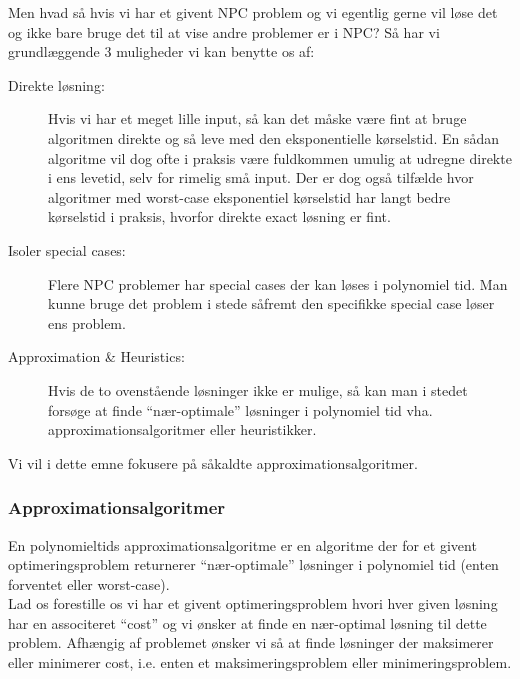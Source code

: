 Men hvad så hvis vi har et givent NPC problem og vi egentlig gerne vil løse det og ikke bare bruge det til at vise andre problemer er i NPC? Så har vi grundlæggende 3 muligheder vi kan benytte os af:

\begin{description}
 \item[Direkte løsning:] Hvis vi har et meget lille input, så kan det måske være fint at bruge algoritmen direkte og så leve med den eksponentielle kørselstid. En sådan algoritme vil dog ofte i praksis være fuldkommen umulig at udregne direkte i ens levetid, selv for rimelig små input. Der er dog også tilfælde hvor algoritmer med worst-case eksponentiel kørselstid har langt bedre kørselstid i praksis, hvorfor direkte exact løsning er fint.
 \item[Isoler special cases:] Flere NPC problemer har special cases der kan løses i polynomiel tid. Man kunne bruge det problem i stede såfremt den specifikke special case løser ens problem.
 \item[Approximation \& Heuristics:] Hvis de to ovenstående løsninger ikke er mulige, så kan man i stedet forsøge at finde ``nær-optimale'' løsninger i polynomiel tid vha. approximationsalgoritmer eller heuristikker.
\end{description}

Vi vil i dette emne fokusere på såkaldte approximationsalgoritmer.


\subsubsection{Approximationsalgoritmer}

En polynomieltids approximationsalgoritme er en algoritme der for et givent optimeringsproblem returnerer ``nær-optimale'' løsninger i polynomiel tid (enten forventet eller worst-case).\\

Lad os forestille os vi har et givent optimeringsproblem hvori hver given løsning har en associteret ``cost'' og vi ønsker at finde en nær-optimal løsning til dette problem. Afhængig af problemet ønsker vi så at finde løsninger der maksimerer eller minimerer cost, i.e. enten et maksimeringsproblem eller minimeringsproblem.

